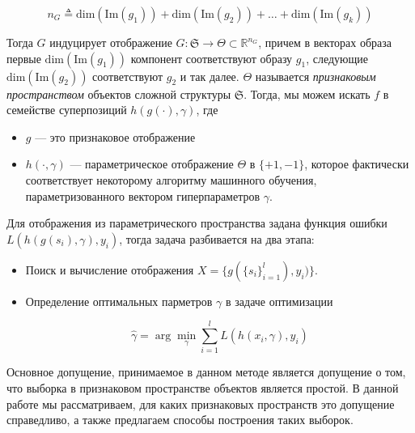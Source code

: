\documentclass[12pt,fleqn,unicode]{article}
\newcommand{\R}{\mathbb{R}}
\begin{document}
$$
n_G \triangleq \mathrm{dim}(\mathrm{Im}(g_1)) +
\mathrm{dim}(\mathrm{Im}(g_2)) + \ldots +
\mathrm{dim}(\mathrm{Im}(g_k))
$$

Тогда $G$ индуцирует отображение $G: \mathfrak{S} \to \Theta \subset \R^{n_G}$,
причем в векторах образа первые $\mathrm{dim}(\mathrm{Im}(g_1))$ компонент соответствуют
образу $g_1$, следующие $\mathrm{dim}(\mathrm{Im}(g_2))$ соответствуют $g_2$
и так далее. $\Theta$ называется \textit{признаковым пространством}
объектов сложной структуры $\mathfrak{S}$. Тогда, мы можем искать $f$ в семействе
суперпозиций $h(g(\cdot), \gamma)$, где

\begin{itemize}
    \item $g$ --- это признаковое отображение
    \item $h(\cdot, \gamma)$ --- параметрическое отображение $\Theta$ в $\{+1, -1\}$,
    которое фактически соответствует некоторому алгоритму машинного обучения,
    параметризованного вектором гиперпараметров $\gamma$.
\end{itemize}

Для отображения из параметрического пространства задана функция ошибки
$L(h(g(s_i), \gamma), y_i)$, тогда задача разбивается на два этапа:


\begin{itemize}
    \item Поиск и вычисление отображения $X = \{g(\{s_i\}_{i=1}^l), y_i)\}$.
    \item Определение оптимальных парметров $\gamma$ в задаче оптимизации

    $$
    \hat{\gamma} = \arg\min_{\gamma} \sum_{i=1}^{l}L(h(x_i, \gamma), y_i)
    $$
\end{itemize}

Основное допущение, принимаемое в данном методе является допущение о том, что
выборка в признаковом пространстве объектов является простой. В данной работе
мы рассматриваем, для каких признаковых пространств это допущение справедливо,
а также предлагаем способы построения таких выборок.
\end{document}
